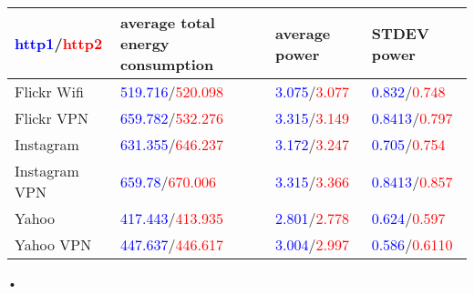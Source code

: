 \documentclass[11pt]{beamer}
\begin{document}
\begin{flushleft}
\begin{tabular}[]{|p{2cm}|p{3cm}|p{2.5cm}|p{2.5cm}|}
\hline
\textcolor{blue}{http1}/\textcolor{red}{http2} & average total energy consumption & average power & STDEV power\\\hline
Flickr Wifi & \textcolor{blue}{519.716}/\textcolor{red}{520.098}  &\textcolor{blue}{3.075}/\textcolor{red}{3.077}  & 
\textcolor{blue}{0.832}/\textcolor{red}{0.748}  \\ \hline
Flickr VPN & \textcolor{blue}{659.782}/\textcolor{red}{532.276}  &\textcolor{blue}{3.315}/\textcolor{red}{3.149}  & 
\textcolor{blue}{0.8413}/\textcolor{red}{0.797}  \\ \hline






Instagram & \textcolor{blue}{631.355}/\textcolor{red}{646.237} & \textcolor{blue}{3.172}/\textcolor{red}{3.247} & \textcolor{blue}{0.705}/\textcolor{red}{0.754} \\ \hline

Instagram VPN & \textcolor{blue}{659.78}/\textcolor{red}{670.006} & \textcolor{blue}{3.315}/\textcolor{red}{3.366} & \textcolor{blue}{0.8413}/\textcolor{red}{0.857} \\ \hline





Yahoo & \textcolor{blue}{417.443}/\textcolor{red}{413.935} &\textcolor{blue}{2.801}/\textcolor{red}{2.778}  & \textcolor{blue}{0.624}/\textcolor{red}{0.597}  \\ \hline 
Yahoo VPN & \textcolor{blue}{447.637}/\textcolor{red}{446.617} &\textcolor{blue}{3.004}/\textcolor{red}{2.997}  & \textcolor{blue}{0.586}/\textcolor{red}{0.6110}  \\ \hline 




\end{tabular}
\end{flushleft}


\begin{frame}{•}

\end{frame}
\end{document}
